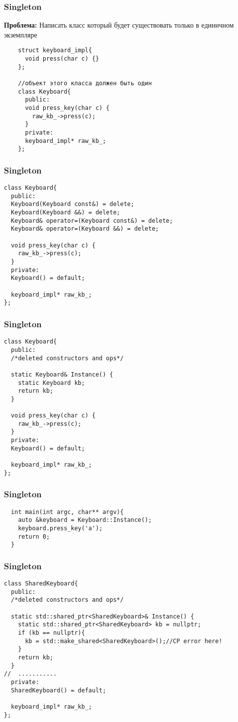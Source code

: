 \begin{frame}[fragile]
  \frametitle{Singleton}
  \textbf{Проблема:} Написать класс который будет существовать только в единичном экземпляре
  \begin{verbatim}
    struct keyboard_impl{
      void press(char c) {}
    };
    
    //объект этого класса должен быть один
    class Keyboard{ 
      public:
      void press_key(char c) {
        raw_kb_->press(c);
      }
      private:
      keyboard_impl* raw_kb_;
    };
  \end{verbatim}
\end{frame}

\begin{frame}[fragile]
  \frametitle{Singleton}
  \begin{verbatim}
class Keyboard{
  public:
  Keyboard(Keyboard const&) = delete;
  Keyboard(Keyboard &&) = delete;
  Keyboard& operator=(Keyboard const&) = delete;
  Keyboard& operator=(Keyboard &&) = delete;
  
  void press_key(char c) {
    raw_kb_->press(c);
  }
  private:
  Keyboard() = default;
  
  keyboard_impl* raw_kb_;
};
  \end{verbatim}
\end{frame}

\begin{frame}[fragile]
  \frametitle{Singleton}
  \begin{verbatim}
class Keyboard{
  public:
  /*deleted constructors and ops*/
  
  static Keyboard& Instance() {
    static Keyboard kb;
    return kb;
  }
  
  void press_key(char c) {
    raw_kb_->press(c);
  }
  private:
  Keyboard() = default;
  
  keyboard_impl* raw_kb_;
};
  \end{verbatim}
\end{frame}

\begin{frame}[fragile]
  \frametitle{Singleton}
  \begin{verbatim}
  int main(int argc, char** argv){
    auto &keyboard = Keyboard::Instance();
    keyboard.press_key('a');
    return 0;
  }
  \end{verbatim}
\end{frame}

\begin{frame}[fragile]
  \frametitle{Singleton}
  \begin{verbatim}
class SharedKeyboard{
  public:
  /*deleted constructors and ops*/
  
  static std::shared_ptr<SharedKeyboard>& Instance() {
    static std::shared_ptr<SharedKeyboard> kb = nullptr;
    if (kb == nullptr){
      kb = std::make_shared<SharedKeyboard>();//CP error here!
    }
    return kb;
  }
//  ...........
  private:
  SharedKeyboard() = default;
  
  keyboard_impl* raw_kb_;
};
  \end{verbatim}
\end{frame}

